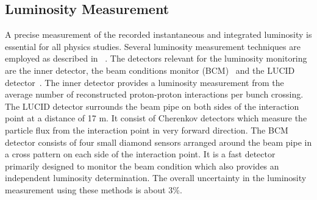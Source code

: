\subsection{Luminosity Measurement}
A precise measurement of the recorded instantaneous and integrated luminosity is essential for
all  physics studies.
Several luminosity measurement techniques are employed as described in ~\cite{luminosity}.
The detectors relevant for the luminosity monitoring are the inner detector,
the beam conditions monitor (BCM)~\cite{luminosity} and the LUCID detector~\cite{lucid}. 
The inner detector provides a 
luminosity measurement from  the average number of reconstructed proton-proton interactions per bunch crossing.
The LUCID detector surrounds the beam pipe on both sides of the interaction point at a distance of 17 m. It consist of
Cherenkov detectors which  measure  the particle flux from the interaction point in  very forward 
direction. The BCM detector consists of four small diamond sensors  arranged around the beam pipe in a cross pattern
on each side of the interaction point.
It is a fast detector primarily designed to monitor the beam condition which also provides an independent luminosity 
determination. The overall uncertainty in the luminosity measurement using 
these methods is about 3\%.























